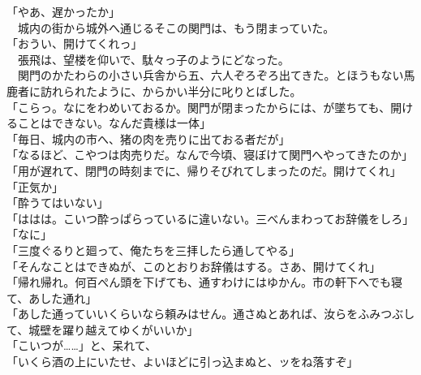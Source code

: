 \documentclass[
  paper=a5,
  fontsize=10pt,
  jafontsize=9.5pt,
  tate,                  %
  open_bracket_pos=nibu, %
]{jlreq}
\begin{document}
「やあ、遅かったか」\\


　城内の街から城外へ通じるそこの関門は、もう閉まっていた。\\


「おうい、開けてくれっ」\\


　張飛は、望楼を仰いで、駄々っ子のようにどなった。\\


　関門のかたわらの小さい兵舎から五、六人ぞろぞろ出てきた。とほうもない馬鹿者に訪れられたように、からかい半分に叱りとばした。\\


「こらっ。なにをわめいておるか。関門が閉まったからには、が墜ちても、開けることはできない。なんだ貴様は一体」\\


「毎日、城内の市へ、猪の肉を売りに出ておる者だが」\\


「なるほど、こやつは肉売りだ。なんで今頃、寝ぼけて関門へやってきたのか」\\


「用が遅れて、閉門の時刻までに、帰りそびれてしまったのだ。開けてくれ」\\


「正気か」\\


「酔うてはいない」\\


「ははは。こいつ酔っぱらっているに違いない。三べんまわってお辞儀をしろ」\\


「なに」\\


「三度ぐるりと廻って、俺たちを三拝したら通してやる」\\


「そんなことはできぬが、このとおりお辞儀はする。さあ、開けてくれ」\\


「帰れ帰れ。何百ぺん頭を下げても、通すわけにはゆかん。市の軒下へでも寝て、あした通れ」\\


「あした通っていいくらいなら頼みはせん。通さぬとあれば、汝らをふみつぶして、城壁を躍り越えてゆくがいいか」\\


「こいつが……」と、呆れて、\\


「いくら酒の上にいたせ、よいほどに引っ込まぬと、ッをね落すぞ」\\
\end{document}
